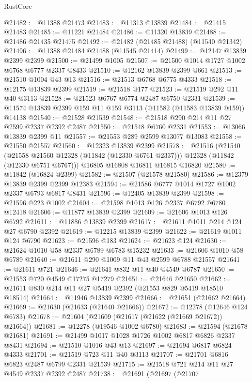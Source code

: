 \begin{lexlean}{RustCore}
\begin{coremodule}
@21482 := @11388 @21473
@21483 := @11313 @13839
@21484 := @21415 @21483
@21485 := @11221 @21484
@21486 := @11320 @13839
@21488 := @21486 @21435 @21475
@21492 := @21482 (@21485 @21488) (@11540 @21342)
@21496 := @11388 @21484 @21488 (@11545 @21414)
@21499 := @12147 @13839 @2399 @2399
@21500 := @21499 @1005
@21507 := @21500 @1014 @1727 @1002 @6768 @6777 @2337 @8433
@21510 := @12162 @13839 @2399 @661
@21513 := @21510 @1004 @43 @13
@21516 := @21513 @6768 @6775 @4333
@21518 := @12175 @13839 @2399
@21519 := @21518 @177
@21523 := @21519 @292 @11 @40 @3113
@21528 := @21523 @6767 @6774 @2487 @6750 @2331
@21539 := @11574 @13839 @2399 @159 @11 @159 @3113 (@11582 (@11583 @13839 @159)) @14138
@21540 := @21528 @21539
@21548 := @21518 @290 @214 @11 @27 @2599 @2337 @2392 @2487
@21550 := @21548 @6760 @2331
@21553 := @13066 @13839 @2399 @11
@21557 := @21553 @289 @2599 @13077 @13083
@21558 := @21550 @21557
@21560 := @12323 @13839 @2399
@21578 := @21516
    (@21540
      (@21558 @21560 @12328 (@11842 (@12330 @6761 @2337)))
      @12328
      (@11842 (@12330 @6751 @6767)))
    @16805
    @16808
    @16811
    @16815
    @16820
@21580 := @11842 (@16824 @2399)
@21582 := @21507 (@21578 @21580)
@21586 := @12379 @13839 @2399 @2399 @12383
@21594 := @21586 @6777 @1014 @1727 @1002 @2337 @6793 @6817 @8431
@21596 := @12405 @13839 @2399
@21598 := @21596 @223 @1002
@21604 := @21598 @1013 @126 @2337 @6792 @6780 @12418
@21606 := @11877 @13839 @2399
@21609 := @21606 @1013 @126 @6792
@21611 := @11886 @13839 @2399
@21617 := @21611 @1011 @214 @124 @27 @6790 @2392
@21619 := @12215 @13839 @2399
@21622 := @21619 @1011 @124 @6790
@21623 := @21596 @183
@21624 := @21623 @124
@21630 := @21624 @1010 @58 @2337 @6789 @6783 @15232
@21633 := @21606 @1010 @58 @6789
@21640 := @21611 @290 @1009 @11 @43 @2599 @6788 @21557
@21641 := @21611 @721
@21646 := @21641 @832 @11 @40 @4549 @6787
@21650 := @21553 @720 @4549 @17275 @17279
@21651 := @21646 @21650
@21662 := @21611 @830 @214 @11 @27 @5419 @2392 (@21553 @829 @5419 @18510 @18514)
@21664 := @11946 @13839 @2399
@21666 := @21651 (@21662 @21664)
@21669 := @21630 (@21633 (@21640 @21666))
@21672 := @12278 (@12646 @124 @6783)
@21678 := @21604 (@21609 (@21617 (@21622 (@21669 @21672)) @21664))
@21681 := @12278 (@19546 @1002 @6780)
@21683 := @21594 (@21678 @21681)
@21691 := @21499 @1017 @1028 @1726 @1002 @6817 @6826 @2337 @8431
@21694 := @21510 @1016 @43 @13
@21697 := @21694 @6817 @6824 @4333
@21701 := @21519 @723 @11 @40 @3113
@21707 := @21701 @6816 @6823 @2487 @6799 @2331 @21539
@21715 := @21518 @721 @214 @11 @27 @4549 @2337 @2392 @2487
@21738 := @21691
    (@21697
      (@21707

\end{coremodule}
\end{lexlean}
